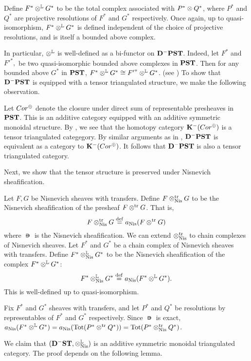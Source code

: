Define $F^* \tL G^*$ to be the total complex associated with
$P^* \tensor Q^*$, where $P^*$ and $Q^*$ are projective 
resolutions of $F^*$ and $G^*$ respectively. Once again, up to
quasi-isomorphism, $F^* \tL G^*$ is defined independent of the 
choice of projective resolutions, and is itself a bounded above 
complex. 

In particular, $\tL$ is well-defined as a bi-functor on 
$\DCat[D]^-\PST$. Indeed, let $F^*$ and ${F'}^*,$ be two 
quasi-isomorphic bounded above complexes in $\PST$. Then for any 
bounded above $G^*$ in $\PST$, $F^* \tL G^* \cong {F'}^* \tL G^*$. 
(see \cite[8.7]{MVW}) To show that $\DCat^-\PST$ is equipped
with a tensor triangulated structure, we make the following 
observation.

Let $\Cor^{\oplus}$ denote the closure under direct 
sum of representable presheaves in $\PST$. This is an additive
category equipped with an additive symmetric monoidal structure.
By \cite[8A.4]{MVW}, we see that the homotopy category 
$\DCat[K]^-(\Cor^{\oplus})$ is a tensor triangulated categegory.
By similar arguments as in \cite[10.4.8]{WH}, $\DCat[D]^-\PST$
is equivalent as a category to $\DCat[K]^-(\Cor^{\oplus})$.
It follows that $\DCat[D]^-\PST$ is also a tensor triangulated 
category.

Next, we show that the tensor structure is preserved under
Nisnevich sheafification.

\begin{defn}\label{def_shcor_tensor}
Let $F, G$ be Nisnevich sheaves with transfers. Define
$F \ttrNis G$ to be the Nisnevich sheafification of the presheaf
$F \ttr G$. That is,
\[
F \ttrNis G \defeq \nis(F \ttr G)
\]
where $\nis$ is the Nisnevich sheafification. We can extend 
$\ttrNis$ to chain complexes of Nisnevich sheaves. Let $F^*$ and 
$G^*$ be a chain complex of Nisnevich sheaves with transfers. 
Define $F^* \tLNis G^*$ to be the Nisnevich sheafification of the 
complex $F^* \tL G^*$:
\[
F^* \tLNis G^* \defeq \nis(F^* \tL G^*).
\]
This is well-defined up to quasi-isomorphism.
\end{defn}

\begin{rmk}
Fix $F^*$ and $G^*$ sheaves with transfers, and let $P^*$ and 
$Q^*$ be resolutions by representables of $F^*$ and $G^*$ 
respectively. Since $\nis$ is exact, $\nis(F^* \tL G^*) = 
\nis(\Tot(P^* \ttr Q^*)) = \Tot(P^* \ttrNis Q^*)$.
\end{rmk}

We claim that $(\DShCor, \tLNis)$ is an additive symmetric 
monoidal triangulated category. The proof depends on the following
lemma.

